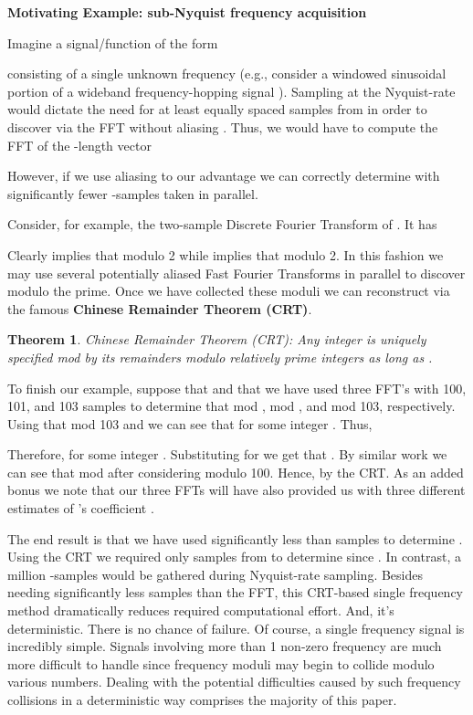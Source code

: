\documentclass{article}
\begin{document}
\noindent \textbf{Motivating Example:  sub-Nyquist frequency acquisition}

Imagine a signal/function  of the form

consisting of a single unknown frequency  (e.g., consider a windowed sinusoidal portion of a wideband frequency-hopping signal \cite{SigApp1}).  Sampling at the Nyquist-rate would dictate the need for at least  equally spaced samples from  in order to discover  via the FFT without aliasing \cite{BoydAl}.  Thus, we would have to compute the FFT of the -length vector

However, if we use aliasing to our advantage we can correctly determine  with significantly fewer -samples taken in parallel.

Consider, for example, the two-sample Discrete Fourier Transform of .  It has
 
Clearly  implies that  modulo 2 while  implies that  modulo 2.  In this fashion we may use several potentially aliased Fast Fourier Transforms in parallel to discover  modulo  the  prime.  Once we have collected these moduli we can reconstruct  via the famous \textbf{Chinese Remainder Theorem (CRT)}.  

\newtheorem{Theorem}{Theorem}
\begin{Theorem}
{\sc Chinese Remainder Theorem (CRT):}  Any integer  is uniquely specified mod  by its remainders modulo  relatively prime integers  as long as .
\end{Theorem}

To finish our example, suppose that  and that we have used three FFT's with 100, 101, and 103 samples to determine that  mod ,  mod , and  mod 103, respectively.  Using that 
 mod 103 and we can see that  for some integer .  Thus, 

Therefore,  for some integer .  Substituting for  we get that .  By similar work we can see that  mod  after considering  modulo 100.  Hence,  by the CRT.  As an added bonus we note that our three FFTs will have also provided us with three different estimates of 's coefficient .

The end result is that we have used significantly less than  samples to determine .  Using the CRT we required only  samples from  to determine  since .  In contrast, a million -samples would be gathered during Nyquist-rate sampling.  Besides needing significantly less samples than the FFT, this CRT-based single frequency method dramatically reduces required computational effort.  And, it's deterministic.  There is no chance of failure.  Of course, a single frequency signal is incredibly simple.  Signals involving more than 1 non-zero frequency are much more difficult to handle since frequency moduli may begin to collide modulo various numbers.  Dealing with the potential difficulties caused by such frequency collisions in a deterministic way comprises the majority of this paper.
\end{document}
